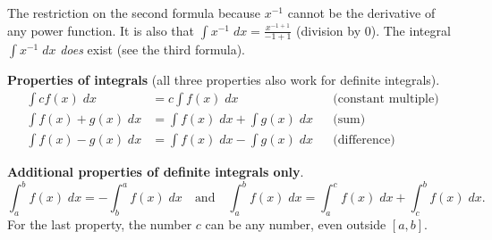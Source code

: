\documentclass[../main.tex]{subfiles}
\begin{document}
  {\footnotesize \faExclamationTriangle{} The restriction  on the second formula  because \(x^{-1}\) cannot be the derivative of any power function. It is also  that \(\textstyle \int x^{-1} \;dx = \frac{x^{-1 + 1}}{-1 + 1}\) (division by \(0\)). The integral \(\textstyle \int x^{-1} \;dx\) \emph{does} exist (see the third formula).}

  \textbf{Properties of integrals} (all three properties also work for definite integrals).
  \begin{align*}
    \int c f(x) \;dx 
    &= c \int f(x) \;dx && \text{(constant multiple)}\\
    \int f(x) + g(x) \;dx 
    &= \int f(x) \;dx + \int g(x) \;dx && \text{(sum)}\\
    \int f(x) - g(x) \;dx 
    &= \int f(x) \;dx - \int g(x) \;dx && \text{(difference)}
  \end{align*}

  \textbf{Additional properties of definite integrals only}.
  \[
    \int_{a}^{b} f(x) \;dx = - \int_{b}^{a} f(x) \;dx 
    \quad\text{and}\quad
    \int_{a}^{b} f(x) \;dx = \int_{a}^{c} f(x) \;dx + \int_{c}^{b} f(x) \;dx.
  \]
  For the last property, the number \(c\) can be any number, even outside \([a,b]\).
\end{document}
